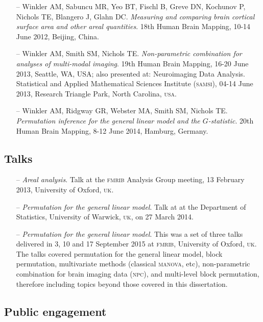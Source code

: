 \begin{itemize}
\item[--] Winkler AM, Sabuncu MR, Yeo BT, Fischl B, Greve DN, Kochunov P, Nichols TE, Blangero J, Glahn DC. \emph{Measuring and comparing brain cortical surface area and other areal quantities}. 18th Human Brain Mapping, 10-14 June 2012, Beijing, China.
\item[--] Winkler AM, Smith SM, Nichols TE. \emph{Non-parametric combination for analyses of multi-modal imaging}. 19th Human Brain Mapping, 16-20 June 2013, Seattle, WA, USA; also presented at: Neuroimaging Data Analysis. Statistical and Applied Mathematical Sciences Institute (\textsc{samsi}), 04-14 June 2013, Research Triangle Park, North Carolina, \textsc{usa}.
\item[--] Winkler AM, Ridgway GR, Webster MA, Smith SM, Nichols TE. \emph{Permutation inference for the general linear model and the $G$-statistic}. 20th Human Brain Mapping, 8-12 June 2014, Hamburg, Germany.
\end{itemize}

\subsection{Talks}

\begin{itemize}
\item[--] \emph{Areal analysis}. Talk at the \textsc{fmrib} Analysis Group meeting, 13 February 2013, University of Oxford, \textsc{uk}.
\item[--] \emph{Permutation for the general linear model}. Talk at at the Department of Statistics, University of Warwick, \textsc{uk}, on 27 March 2014.
\item[--] \emph{Permutation for the general linear model}. This was a set of three talks delivered in 3, 10 and 17 September 2015 at \textsc{fmrib}, University of Oxford, \textsc{uk}. The talks covered permutation for the general linear model, block permutation, multivariate methods (classical \textsc{manova}, etc), non-parametric combination for brain imaging data (\textsc{npc}), and multi-level block permutation, therefore including topics beyond those covered in this dissertation.
\end{itemize}

\subsection{Public engagement}


